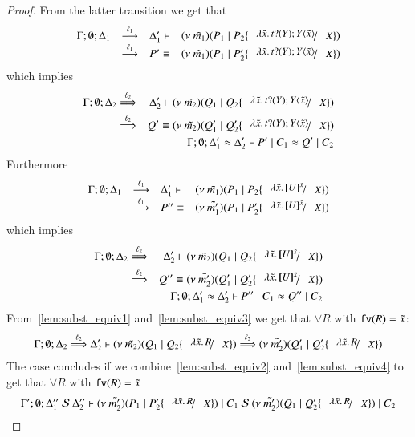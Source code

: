 \begin{proof}
	\noi From the latter transition we get that
%
\[
		\mhorel{\Gamma}{\Delta_1}{\newsp{\tilde{m_1}}{P_1 \Par P_2 \subst{\abs{\tilde{x}}{\binp{t}{Y} \appl{Y}{\tilde{x}}}}{X}}}
		{\by{\ell_1}}{\Delta_1'}{P' \scong}{\newsp{\tilde{m_1}}{P_1 \Par P_2' \subst{\abs{\tilde{x}}{\binp{t}{Y} \appl{Y}{\tilde{x}}}}{X}}}
\]
%
	\noi which implies
%
	\begin{eqnarray}
		\Gamma; \es; \Delta_2 &\By{\ell_2}& \Delta_2' \proves \newsp{\tilde{m_2}}{Q_1 \Par Q_2 \subst{\abs{\tilde{x}}{\binp{t}{Y} \appl{Y}{\tilde{x}}}}{X}} \nonumber \\
		&\By{\ell_2}&
		Q' \scong \newsp{\tilde{m_2}}{Q_1' \Par Q_2' \subst{\abs{\tilde{x}}{\binp{t}{Y} \appl{Y}{\tilde{x}}}}{X}} \label{lem:subst_equiv1}
		\\
		&&\horel{\Gamma}{\Delta_1'}{P' \Par C_1}{\wb}{\Delta_2'}{Q' \Par C_2} \label{lem:subst_equiv2}
	\end{eqnarray}
%
	\noi Furthermore
%
\[
	\mhorel{\Gamma}{\Delta_1}{\newsp{\tilde{m_1}}{P_1 \Par P_2 \subst{\abs{\tilde{x}}{\map{U}^{\tilde{x}}}}{X}}}{\by{\ell_1}}
	{\Delta_1'}{P'' \scong}{\newsp{\tilde{m_1'}}{P_1 \Par P_2' \subst{\abs{\tilde{x}}{\map{U}^{\tilde{x}}}}{X}}}
\]
%
	\noi which implies
%
	\begin{eqnarray}
		\Gamma; \es; \Delta_2 &\By{\ell_2}& \Delta_2' \proves \newsp{\tilde{m_2}}{Q_1 \Par Q_2 \subst{\abs{\tilde{x}}{\map{U}^{\tilde{x}}}}{X}} \nonumber \\
		&\By{\ell_2}& Q'' \scong \newsp{\tilde{m_2'}}{Q_1' \Par Q_2' \subst{\abs{\tilde{x}}{\map{U}^{\tilde{x}}}}{X}} \label{lem:subst_equiv3}
		\\
		&&\horel{\Gamma}{\Delta_1'}{P'' \Par C_1}{\wb}{\Delta_2'}{Q'' \Par C_2} \label{lem:subst_equiv4}
	\end{eqnarray}
%
	\noi From~\ref{lem:subst_equiv1} and~\ref{lem:subst_equiv3} we get that $\forall R$ with $\mathtt{fv}(R) = \tilde{x}$:
%
	\begin{eqnarray*}
		\horel{\Gamma}{\Delta_2}{\newsp{\tilde{m_2}}{Q_1 \Par Q_2 \subst{\abs{\tilde{x}}{R}}{X}}}{\By{\ell_2}}{\Delta_2'}{\newsp{\tilde{m_2'}}{Q_1' \Par Q_2' \subst{\abs{\tilde{x}}{R}}{X}}}
	\end{eqnarray*}
%
	\noi The case concludes if we combine~\ref{lem:subst_equiv2} and~\ref{lem:subst_equiv4} to get that $\forall R$ with $\mathtt{fv}(R) = \tilde{x}$
%
	\begin{eqnarray*}
		\horel{\Gamma'}{\Delta_1''}{\newsp{\tilde{m_2'}}{P_1 \Par P_2' \subst{\abs{\tilde{x}}{R}}{X}} \Par C_1}
		{\ \mathcal{S}\ }
		{\Delta_2''}{\newsp{\tilde{m_2'}}{Q_1 \Par Q_2' \subst{\abs{\tilde{x}}{R}}{X}} \Par C_2}
	\end{eqnarray*}


\end{proof}
